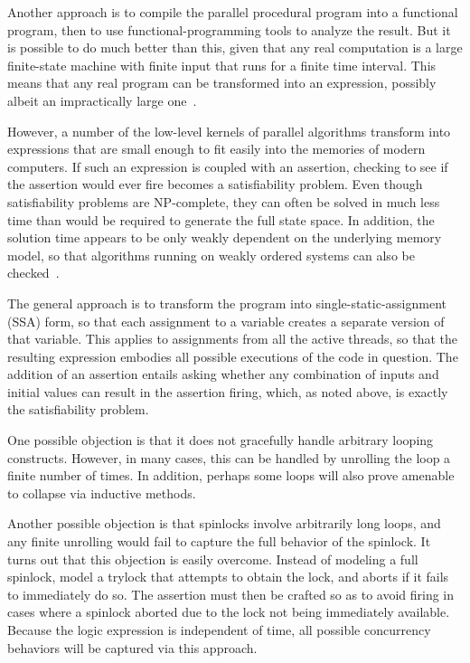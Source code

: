 Another approach is to compile the parallel procedural program into
a functional program, then to use functional-programming tools to analyze
the result.
But it is possible to do much better than this, given that any real
computation is a large finite-state machine with finite input that
runs for a finite time interval.
This means that any real program can be transformed into an expression,
possibly albeit an impractically large one~\cite{VijayDSilva2012-sas}.

However, a number of the low-level kernels of parallel algorithms transform
into expressions that are small enough to fit easily into the memories
of modern computers.
If such an expression is coupled with an assertion, checking to see if
the assertion would ever fire becomes a satisfiability problem.
Even though satisfiability problems are NP-complete, they can often
be solved in much less time than would be required to generate the
full state space.
In addition, the solution time appears to be only weakly dependent on
the underlying memory model, so that algorithms running on weakly ordered
systems can also be checked~\cite{JadeAlglave2013-cav}.

The general approach is to transform the program into single-static-assignment
(SSA) form, so that each assignment to a variable creates a separate
version of that variable.
This applies to assignments from all the active threads, so that the
resulting expression embodies all possible executions of the code
in question.
The addition of an assertion entails asking whether any combination of
inputs and initial values can result in the assertion firing, which,
as noted above, is exactly the satisfiability problem.

One possible objection is that it does not gracefully handle arbitrary
looping constructs.
However, in many cases, this can be handled by unrolling the loop a
finite number of times.
In addition, perhaps some loops will also prove amenable to collapse
via inductive methods.

Another possible objection is that spinlocks involve arbitrarily long
loops, and any finite unrolling would fail to capture the full behavior
of the spinlock.
It turns out that this objection is easily overcome.
Instead of modeling a full spinlock, model a trylock that attempts to
obtain the lock, and aborts if it fails to immediately do so.
The assertion must then be crafted so as to avoid firing in cases
where a spinlock aborted due to the lock not being immediately available.
Because the logic expression is independent of time, all possible
concurrency behaviors will be captured via this approach.

